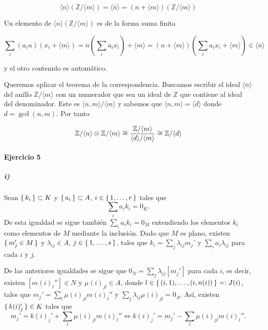 \documentclass[./ejercicios.tex]{subfiles}
\begin{document}
\begin{equation}
  \langle n \rangle  (\mathbb{Z}/ \langle m \rangle) = \langle \bar n \rangle = (n+\langle m  \rangle) ( \mathbb Z / \langle m\rangle )
\end{equation}

Un elemento de $\langle n \rangle  (\mathbb{Z}/ \langle m \rangle) $ es de la forma suma finita

\begin{equation}
\sum_i (a_i n ) (x_i + \langle m \rangle)  = n(  \sum_i a_i x_i) + \langle m \rangle  = (n+ \langle m \rangle)  ( \sum_i a_i x_i + \langle m \rangle) \in \langle \overline n \rangle
\end{equation}

y el otro contenido es automático.

Queremos aplicar el teorema de la correspondencia. Buscamos escribir el ideal $\langle \overline{n} \rangle $ del anillo ${ \mathbb Z}/ \langle m \rangle$ con un numerador que sea un ideal de ${ \mathbb Z}$ que contiene al ideal del denominador. Este es $\langle n,m \rangle / \langle m \rangle$ y sabemos que $\langle n,m \rangle = \langle d \rangle$ donde $d= \gcd(n,m)$. Por tanto

\begin{equation}
  \mathbb{Z}/\langle n\rangle \otimes \mathbb{Z} / \langle m \rangle \cong \frac{\mathbb{Z} / \langle m \rangle }{ \langle d \rangle / \langle m\rangle } \cong \mathbb{Z} / \langle d \rangle
\end{equation}

\paragraph{Ejercicio 5}
\subparagraph{i)} Sean $\set{k_i}\subset K$ y $\set{a_i}\subset A$, $i\in\set{1,\dots,r}$ tales que
$$\sum_{i}a_ik_i=0_K.$$
De esta igualdad se sigue también $\sum_{i}a_ik_i=0_M$ entendiendo los elementos $k_i$ como elementos de $M$ mediante la inclusión. Dado que $M$ es plano, existen $\set{m_j'\in M}$ y $\lambda_{ij}\in A$, $j\in\set{1,\dots, s}$, tales que $k_i=\sum_j\lambda_{ij}m_j'$ y $\sum_i a_i\lambda_{ij}$ para cada $i$ y $j$.

De las anteriores igualdades se sigue que $0_N=\sum_j\lambda_{ij}[m_j']$ para cada $i$, es decir, existen $[m(i)_{l}'']\in N$ y $\mu(i)_{jl}\in A$, donde $l\in\set{(i,1),\dots,(i,n(i))}=:J(i)$, tales que $m_j'=\sum_l\mu(i)_{jl}m(i)_l''$ y $\sum_{j}\lambda_{ij}\mu(i)_{jl}=0_A.$ Así, existen $\set{k(i)_j'}\in K$ tales que
$$m_j'=k(i)_j'+\sum_l\mu(i)_{jl}m(i)_l''\Longleftrightarrow k(i)_j'=m_{j}'-\sum_{l}\mu(i)_{jl}m(i)_l''.$$
\end{document}
